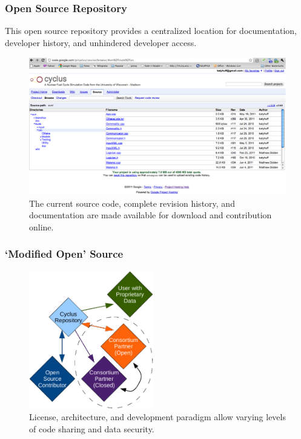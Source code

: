 \begin{frame}[ctb!]
  \frametitle{Open Source Repository}
    This open source repository provides a centralized location for 
    documentation, developer history, and unhindered developer access.
  \begin{figure}[htbp!]
    \begin{center}
      \includegraphics[height=6cm]{source.eps}
    \end{center}
    \caption{The current source code, complete revision history, and 
    documentation are made available for download and contribution 
    online. }
    \label{fig:open}
  \end{figure}
\end{frame}
\begin{frame}[ctb!]
  \frametitle{ `Modified Open' Source}
  \begin{figure}[hbtp!]
    \begin{center}
      \includegraphics[height=6cm]{security.eps}
    \end{center}
    \caption{License, architecture, and development paradigm allow 
    varying levels of code sharing and data security.}
    \label{fig:security}
  \end{figure}
\end{frame}
